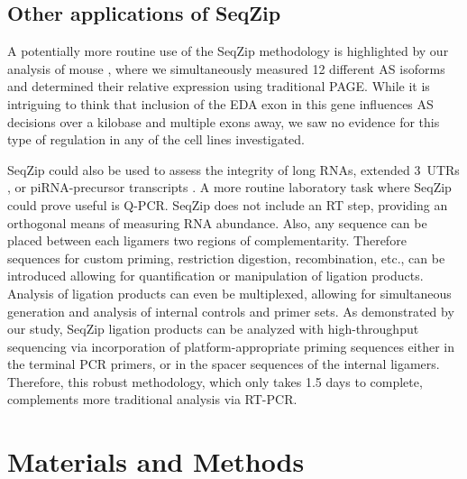 	\subsection{Other applications of SeqZip}

		A potentially more routine use of the SeqZip methodology is highlighted by our analysis of mouse \fn{}, where we simultaneously measured 12 different AS isoforms and determined their relative expression using traditional PAGE. While it is intriguing to think that inclusion of the EDA exon in this gene influences AS decisions over a kilobase and multiple exons away, we saw no evidence for this type of regulation in any of the cell lines investigated.

		SeqZip could also be used to assess the integrity of long RNAs, extended 3\textprime~UTRs \citep{Wang2013b}, or piRNA-precursor transcripts \citep{Li2013h}. A more routine laboratory task where SeqZip could prove useful is Q-PCR. SeqZip does not include an RT step, providing an orthogonal means of measuring RNA abundance. Also, any sequence can be placed between each ligamers two regions of complementarity. Therefore sequences for custom priming, restriction digestion, recombination, etc., can be introduced allowing for quantification or manipulation of ligation products. Analysis of ligation products can even be multiplexed, allowing for simultaneous generation and analysis of internal controls and primer sets. As demonstrated by our \dscam{} study, SeqZip ligation products can be analyzed with high-throughput sequencing via incorporation of platform-appropriate priming sequences either in the terminal PCR primers, or in the spacer sequences of the internal ligamers. Therefore, this robust methodology, which only takes 1.5 days to complete, complements more traditional analysis via RT-PCR. 

\section{Materials and Methods}
	\label{SeqZipPaper:sec: Methods and Materials}

